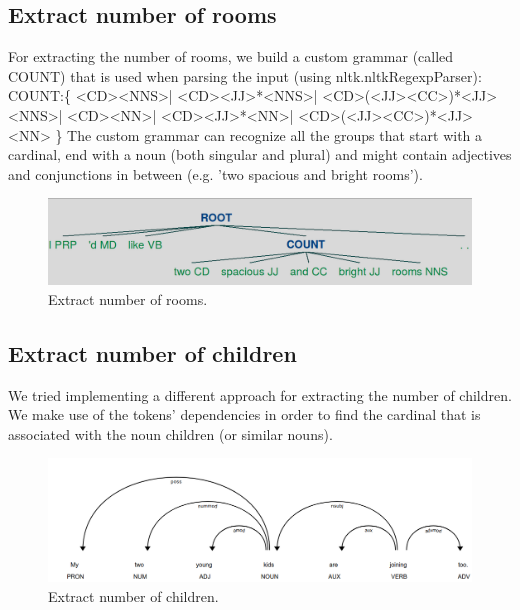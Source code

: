 \documentclass[runningheads,a4paper,11pt]{report}
\begin{document}
\subsection{Extract number of rooms}
For extracting the number of rooms, we build a custom grammar (called COUNT) that is used when parsing the input (using nltk.nltkRegexpParser):
\newline
COUNT:\{
\newline\tab<CD><NNS>|
\newline\tab<CD><JJ>*<NNS>|
\newline\tab<CD>(<JJ><CC>)*<JJ><NNS>|
\newline\tab<CD><NN>|
\newline\tab<CD><JJ>*<NN>|
\newline\tab<CD>(<JJ><CC>)*<JJ><NN>
\newline\}
\newline
The custom grammar can recognize all the groups that start with a cardinal, end with a noun (both singular and plural) and might contain adjectives and conjunctions in between (e.g. 'two spacious and bright rooms'). 

\begin{figure}[H]
	\caption{Extract number of rooms.}
	\includegraphics[trim={0 0 0 1cm},clip,width=15cm]{extract_rooms.png}
	\centering
\end{figure}

\subsection{Extract number of children}
We tried implementing a different approach for extracting the number of children. We make use of the tokens' dependencies in order to find the cardinal that is associated with the noun children (or similar nouns).

\begin{figure}[H]
	\caption{Extract number of children.}
	\includegraphics[trim={0 0 0 1cm},clip,width=15cm]{extract_children.png}
	\centering
\end{figure}
\end{document}
